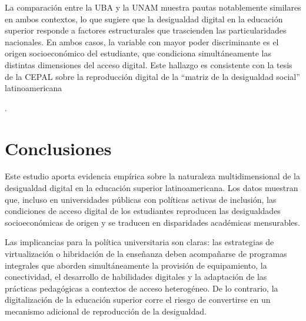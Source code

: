    


    
    La comparación entre la UBA y la UNAM muestra pautas notablemente similares en ambos contextos, lo que sugiere que la desigualdad digital en la educación superior responde a factores estructurales que trascienden las particularidades nacionales. En ambos casos, la variable con mayor poder discriminante es el origen socioeconómico del estudiante, que condiciona simultáneamente las distintas dimensiones del acceso digital. Este hallazgo es consistente con la tesis de la CEPAL sobre la reproducción digital de la “matriz de la desigualdad social” latinoamericana 
    
    \autocite{2556-CEPAL2021}
    
    .
   
   


\section{Conclusiones}

    
    Este estudio aporta evidencia empírica sobre la naturaleza multidimensional de la desigualdad digital en la educación superior latinoamericana. Los datos muestran que, incluso en universidades públicas con políticas activas de inclusión, las condiciones de acceso digital de los estudiantes reproducen las desigualdades socioeconómicas de origen y se traducen en disparidades académicas mensurables.
   
   


    
    Las implicancias para la política universitaria son claras: las estrategias de virtualización o hibridación de la enseñanza deben acompañarse de programas integrales que aborden simultáneamente la provisión de equipamiento, la conectividad, el desarrollo de habilidades digitales y la adaptación de las prácticas pedagógicas a contextos de acceso heterogéneo. De lo contrario, la digitalización de la educación superior corre el riesgo de convertirse en un mecanismo adicional de reproducción de la desigualdad.
   
   


